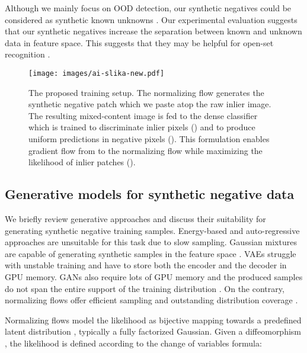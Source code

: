 \documentclass[lettersize,journal,hidelinks]{IEEEtran}
\begin{document}
Although we mainly focus on OOD detection, our synthetic negatives could be considered as synthetic known unknowns \cite{neal18eccv,kong22tpami}.
Our experimental evaluation suggests that our synthetic negatives increase the separation between known and unknown data in feature space.
This suggests that they may be helpful for open-set recognition \cite{hendrycks19arxiv,vaze22iclr}.






\begin{figure*}[!b]
    \centering
    \texttt{[image: images/ai-slika-new.pdf]}
    \caption{
    The proposed training setup.
    The normalizing flow generates the synthetic negative patch  which we paste atop the raw inlier image.
The resulting mixed-content image  is fed to the dense classifier which is trained to discriminate inlier pixels () and to produce uniform predictions in negative pixels ().
This formulation enables gradient flow from  to the normalizing flow while maximizing the likelihood of inlier patches ().
}
\label{fig:training-scheme}
\end{figure*}

\subsection{Generative models for synthetic negative data}
\label{sec:gm}
We briefly review generative approaches and
discuss their suitability for generating
synthetic negative training samples.
Energy-based \cite{salakhutdinov09aistats} and auto-regressive \cite{vanoord16icml} approaches are unsuitable for this task due to slow sampling.
Gaussian mixtures are capable of generating synthetic samples in the feature space \cite{du22iclr}.
VAEs \cite{kingma14iclr} struggle with unstable training \cite{vahdat20neurips} and have to store both the encoder and the decoder in GPU memory. 
GANs \cite{goodfellow20acm} also require lots of GPU memory and the produced samples do not span the entire support of the training distribution \cite{lucas19nips}.
On the contrary, normalizing flows \cite{dinh17iclr} offer efficient sampling and outstanding distribution coverage \cite{grcic21neurips}.

Normalizing flows \cite{dinh17iclr,kingma18neurips} model the likelihood as bijective mapping towards a predefined latent distribution , typically a fully factorized Gaussian.
Given a diffeomorphism , the likelihood is defined according to the change of variables formula:
\end{document}
